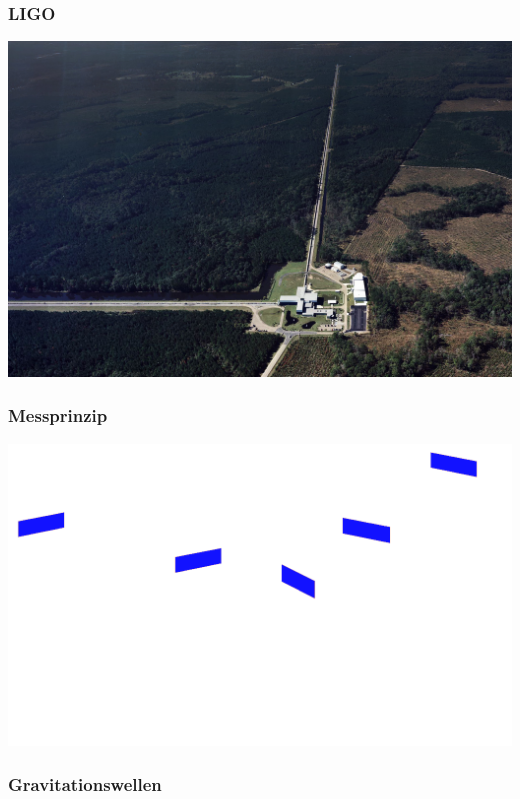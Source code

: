 \documentclass[14pt]{beamer}
\begin{document}
\begin{frame}
	\frametitle{LIGO}
	\begin{center}
		\includegraphics[width=\textwidth]{aerial_ligo5_300.jpg}
	\end{center}
\end{frame}

\begin{frame}
	\frametitle{Messprinzip}
	\begin{center}
		\includegraphics[width=\textwidth]{ligo.png}
	\end{center}
\end{frame}

\begin{frame}
	\frametitle{Gravitationswellen}
	\begin{center}
	\end{center}
\end{frame}
\end{document}
